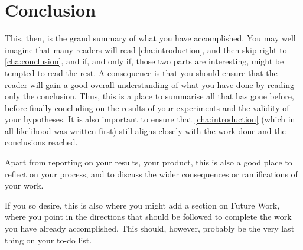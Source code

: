 \chapter{Conclusion}
\label{cha:conclusion}

This, then, is the grand summary of what you have accomplished.  You may
well imagine that many readers will read \autoref{cha:introduction}, and
then skip right to \autoref{cha:conclusion}, and if, and only if, those two
parts are interesting, might be tempted to read the rest. A consequence is
that you should ensure that the reader will gain a good overall
understanding of what you have done by reading only the conclusion.  Thus,
this is a place to summarise all that has gone before, before finally
concluding on the results of your experiments and the validity of your
hypotheses. It is also important to ensure that \autoref{cha:introduction}
(which in all likelihood was written first) still aligns closely with the
work done and the conclusions reached.

Apart from reporting on your results, \ie your product, this is also a good
place to reflect on your process, and to discuss the wider consequences or
ramifications of your work.

If you so desire, this is also where you might add a section on Future Work,
where you point in the directions that should be followed to complete the
work you have already accomplished. This should, however, probably be the
very last thing on your to-do list.


